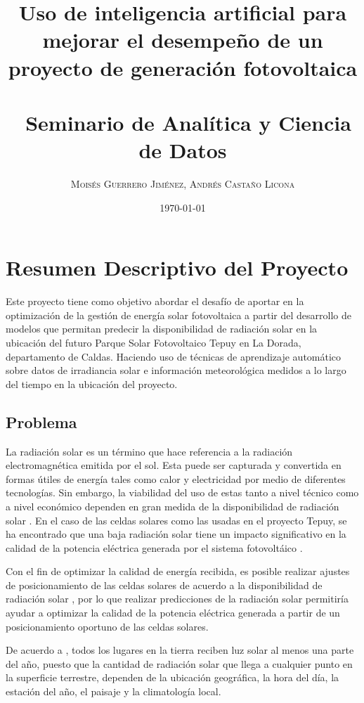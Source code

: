 \documentclass[a4paper]{article}
\title{Uso de inteligencia artificial para mejorar el desempeño de un proyecto de generación fotovoltaica \\\ 
\\\
 \large Seminario de Analítica y Ciencia de Datos}
\author{\textsc{Moisés Guerrero Jiménez, Andrés Castaño Licona}}
\date{\today}
\begin{document}
\maketitle

\section{Resumen Descriptivo del Proyecto}

Este proyecto tiene como objetivo abordar el desafío de aportar en la optimización de la gestión de energía solar fotovoltaica a partir del desarrollo de modelos que permitan predecir la disponibilidad de radiación solar en la ubicación del futuro Parque Solar Fotovoltaico Tepuy en La Dorada, departamento de Caldas. Haciendo uso de técnicas de aprendizaje automático sobre datos de irradiancia solar e información meteorológica medidos a lo largo del tiempo en la ubicación del proyecto.

\subsection{Problema}

La radiación solar es un término que hace referencia a la radiación electromagnética emitida por el sol. Esta puede ser capturada y convertida en formas útiles de energía tales como calor y electricidad por medio de diferentes tecnologías. Sin embargo, la viabilidad del uso de estas tanto a nivel técnico como a nivel económico dependen en gran medida de la disponibilidad de radiación solar \cite{ref:energygov}. En el caso de las celdas solares como las usadas en el proyecto Tepuy, se ha encontrado que una baja radiación solar tiene un impacto significativo en la calidad de la potencia eléctrica generada por el sistema fotovoltáico \cite{ref:solarirreff}.

Con el fin de optimizar la calidad de energía recibida, es posible realizar ajustes de posicionamiento de las celdas solares de acuerdo a la disponibilidad de radiación solar \cite{ref:estsolirr}, por lo que realizar predicciones de la radiación solar permitiría ayudar a optimizar la calidad de la potencia eléctrica generada a partir de un posicionamiento oportuno de las celdas solares.

De acuerdo a \cite{ref:energygov}, todos los lugares en la tierra reciben luz solar al menos una parte del año, puesto que la cantidad de radiación solar que llega a cualquier punto en la superficie terrestre, dependen de la ubicación geográfica, la hora del día, la estación del año, el paisaje y la climatología local.
\end{document}
